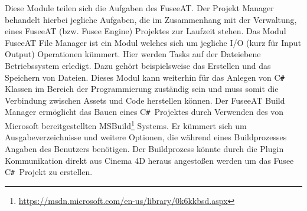 \documentclass[pagesize, paper=a4, fontsize=12pt, titlepage=true, headings=small, headnosepline, abstractoff, liststotoc, nochapterprefix, plainheadsepline, twoside]{scrreprt}
\newcommand{\CSS}{C\texttt{\# }}
\begin{document}
Diese Module teilen sich die Aufgaben des FuseeAT. Der Projekt Manager behandelt hierbei jegliche Aufgaben, die im Zusammenhang mit der Verwaltung, eines FuseeAT (bzw. Fusee Engine) Projektes zur Laufzeit stehen.
Das Modul FuseeAT File Manager ist ein Modul welches sich um jegliche I/O (kurz für Input Output) Operationen kümmert. Hier werden Tasks auf der Dateiebene Betriebssystem erledigt. Dazu gehört beispielsweise das Erstellen und das Speichern von Dateien. Dieses Modul kann weiterhin für das Anlegen von \CSS Klassen im Bereich der Programmierung zuständig sein und muss somit die Verbindung zwischen Assets und Code herstellen können.
Der FuseeAT Build Manager ermöglicht das Bauen eines \CSS Projektes durch Verwenden des von Microsoft bereitgestellten MSBuild\footnote{\url{https://msdn.microsoft.com/en-us/library/0k6kkbsd.aspx}} Systems. Er kümmert sich um Ausgabeverzeichnisse und weitere Optionen, die während eines Buildprozesses Angaben des Benutzers benötigen. Der Buildprozess könnte durch die Plugin Kommunikation direkt aus Cinema 4D heraus angestoßen werden um das Fusee \CSS Projekt zu erstellen.
\end{document}
